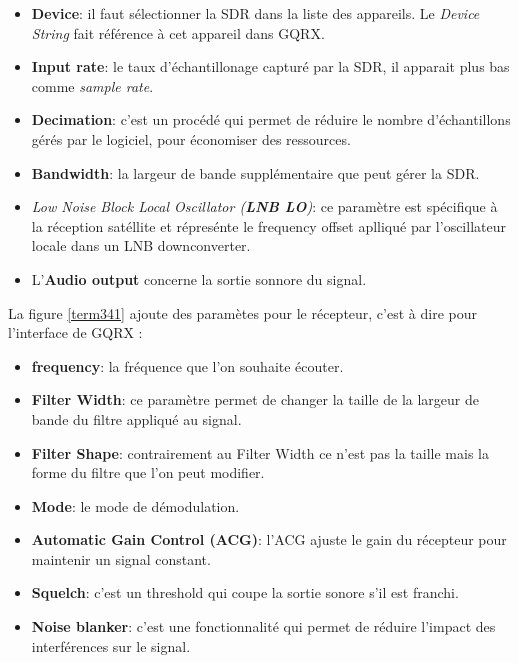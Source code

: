 \vspace{0.1cm}

\begin{itemize}
\item \textbf{Device}: il faut sélectionner la SDR dans la liste des appareils. Le \textit{Device String} fait référence à cet appareil dans GQRX.
\item \textbf{Input rate}: le taux d'échantillonage capturé par la SDR, il apparait plus bas comme \textit{sample rate}.
\item \textbf{Decimation}: c'est un procédé qui permet de réduire le nombre d'échantillons gérés par le logiciel, pour économiser des ressources.
\item \textbf{Bandwidth}: la largeur de bande supplémentaire que peut gérer la SDR.
\item \textit{Low Noise Block Local Oscillator (\textbf{LNB LO})}: ce paramètre est spécifique à la réception satéllite et répresénte le frequency offset aplliqué par l'oscillateur locale dans un LNB downconverter.
\item L'\textbf{Audio output} concerne la sortie sonnore du signal.
\end{itemize}

\vspace{0.1cm}

La figure \ref{term341} ajoute des paramètes pour le récepteur, c'est à dire pour l'interface de GQRX :

\vspace{0.1cm}

\begin{itemize}
\item \textbf{frequency}: la fréquence que l'on souhaite écouter.
\item \textbf{Filter Width}: ce paramètre permet de changer la taille de la largeur de bande du filtre appliqué au signal.
\item \textbf{Filter Shape}: contrairement au Filter Width ce n'est pas la taille mais la forme du filtre que l'on peut modifier.
\item \textbf{Mode}: le mode de démodulation.
\item \textbf{Automatic Gain Control (ACG)}: l'ACG ajuste le gain du récepteur pour maintenir un signal constant.
\item \textbf{Squelch}: c'est un threshold qui coupe la sortie sonore s'il est franchi.
\item \textbf{Noise blanker}: c'est une fonctionnalité qui permet de réduire l'impact des interférences sur le signal.
\end{itemize}

